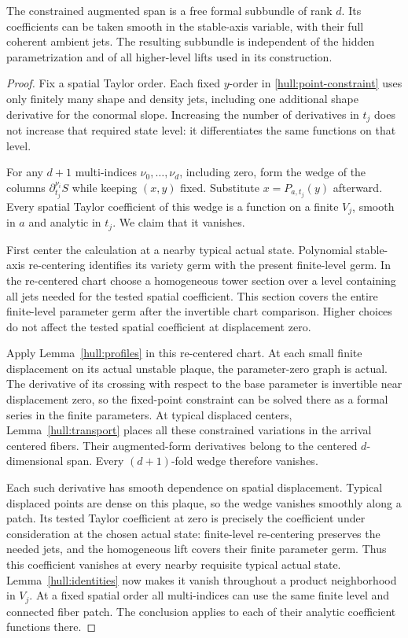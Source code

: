 \begin{lemma}\label{hull:rank}
The constrained augmented span is a free formal subbundle of rank
$d$. Its coefficients can be taken smooth in the stable-axis variable,
with their full coherent ambient jets. The resulting subbundle is
independent of the hidden parametrization and of all higher-level
lifts used in its construction.
\end{lemma}

\begin{proof}
Fix a spatial Taylor order. Each fixed $y$-order in
\eqref{hull:point-constraint} uses only finitely many shape and density
jets, including one additional shape derivative for the conormal slope.
Increasing the number of derivatives in $t_j$ does not increase that
required state level: it differentiates the same functions on that level.

For any $d+1$ multi-indices $\nu_0,\ldots,\nu_d$, including zero,
form the wedge of the columns $\partial_{t_j}^{\nu_i}S$ while keeping
$(x,y)$ fixed. Substitute $x=P_{a,t_j}(y)$ afterward. Every spatial
Taylor coefficient of this wedge is a function on a finite $V_j$,
smooth in $a$ and analytic in $t_j$. We claim that it vanishes.

First center the calculation at a nearby typical actual state.
Polynomial stable-axis re-centering identifies its variety germ
with the present finite-level germ. In the re-centered chart choose
a homogeneous tower section over a level containing all jets needed
for the tested spatial coefficient. This section covers the entire
finite-level parameter germ after the invertible chart comparison.
Higher choices do not affect the tested spatial coefficient at
displacement zero.

Apply Lemma~\ref{hull:profiles} in this re-centered chart. At each
small finite displacement on its actual unstable plaque, the
parameter-zero graph is actual. The derivative of its crossing with
respect to the base parameter is invertible near displacement zero,
so the fixed-point constraint can be solved there as a formal series
in the finite parameters. At typical displaced centers,
Lemma~\ref{hull:transport} places all these constrained variations in
the arrival centered fibers. Their augmented-form derivatives belong
to the centered $d$-dimensional span. Every $(d+1)$-fold wedge
therefore vanishes.

Each such derivative has smooth dependence on spatial displacement.
Typical displaced points are dense on this plaque, so the wedge
vanishes smoothly along a patch. Its tested Taylor coefficient at
zero is precisely the coefficient under consideration at the
chosen actual state: finite-level re-centering preserves the needed
jets, and the homogeneous lift covers their finite parameter germ.
Thus this coefficient vanishes at every nearby requisite typical
actual state. Lemma~\ref{hull:identities} now makes it vanish
throughout a product neighborhood in $V_j$. At a fixed spatial
order all multi-indices can use the same finite level and connected
fiber patch. The conclusion applies to each of their analytic
coefficient functions there.


\end{proof}
